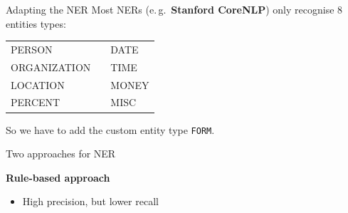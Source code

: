 \documentclass[xcolor=x11names, aspectratio=169,usenames,dvipsnames]{beamer}
\begin{document}
\begin{frame}[fragile]{Adapting the NER}\large
Most NERs (e.\,g.\ \textbf{Stanford CoreNLP}) only recognise 8 entities types:

\begin{center}\ttfamily
\begin{tabular}{lp{4em}l}
PERSON&&DATE\\
ORGANIZATION&&TIME\\
LOCATION&&MONEY\\
PERCENT&&MISC
\end{tabular}
\end{center}

So we have to add the \alert{custom entity type \texttt{FORM}}.
\end{frame}

\begin{frame}{Two approaches for NER}
\begin{minipage}[t]{0.45\textwidth}
\textbf{Rule-based approach}
\begin{itemize}
\item High precision, but lower recall


\end{itemize}
\end{minipage}
\end{frame}
\end{document}
